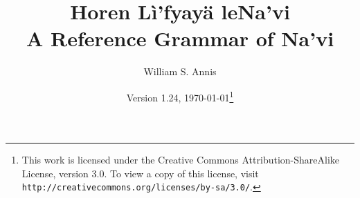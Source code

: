 \documentclass[12pt,oneside]{book}
\begin{document}
\frenchspacing

\title{Horen Lì'fyayä leNa'vi\\A Reference Grammar of Na'vi}
\author{William S. Annis}
\date{Version 1.24, \today\footnote{This work is licensed
    under the Creative Commons Attribution-ShareAlike License, version
    3.0.  To view a copy of this license, visit 
    \texttt{http://creativecommons.org/licenses/by-sa/3.0/}.}}
\maketitle

\setcounter{tocdepth}{2}
\begin{multicols}{2}
\tableofcontents
\end{multicols}









\appendix
{\small \printindex}


\end{document}
